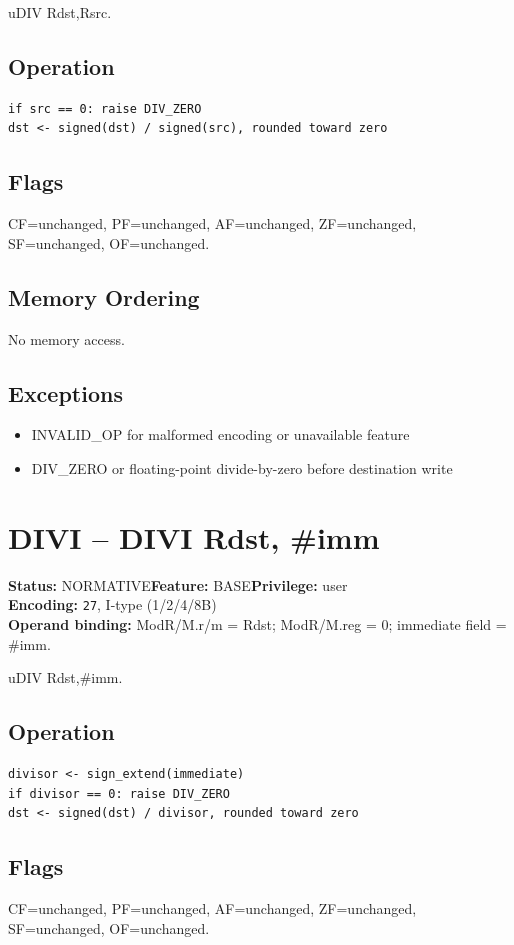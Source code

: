 \documentclass[10pt]{article}
\begin{document}
uDIV Rdst,Rsrc.

\subsection*{Operation}
\begin{lstlisting}
if src == 0: raise DIV_ZERO
dst <- signed(dst) / signed(src), rounded toward zero
\end{lstlisting}
\subsection*{Flags}
CF=unchanged, PF=unchanged, AF=unchanged, ZF=unchanged, SF=unchanged, OF=unchanged.
\subsection*{Memory Ordering}
No memory access.
\subsection*{Exceptions}
\begin{itemize}
\item INVALID\_OP for malformed encoding or unavailable feature
\item DIV\_ZERO or floating-point divide-by-zero before destination write
\end{itemize}
\clearpage

\section{DIVI -- DIVI Rdst, \#imm}
\textbf{Status:} NORMATIVE\quad \textbf{Feature:} BASE\quad \textbf{Privilege:} user\\
\textbf{Encoding:} \texttt{27}, I-type (1/2/4/8B)\\
\textbf{Operand binding:} ModR/M.r/m = Rdst; ModR/M.reg = 0; immediate field = \#imm.

uDIV Rdst,\#imm.

\subsection*{Operation}
\begin{lstlisting}
divisor <- sign_extend(immediate)
if divisor == 0: raise DIV_ZERO
dst <- signed(dst) / divisor, rounded toward zero
\end{lstlisting}
\subsection*{Flags}
CF=unchanged, PF=unchanged, AF=unchanged, ZF=unchanged, SF=unchanged, OF=unchanged.
\end{document}
